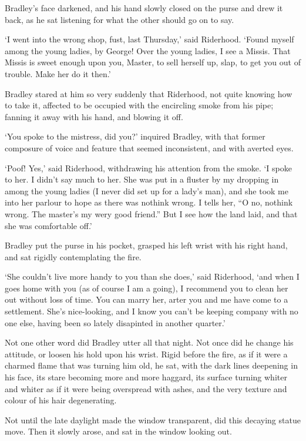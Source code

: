 Bradley’s face darkened, and his hand slowly closed on the purse and
drew it back, as he sat listening for what the other should go on to
say.

‘I went into the wrong shop, fust, last Thursday,’ said Riderhood.
‘Found myself among the young ladies, by George! Over the young ladies,
I see a Missis. That Missis is sweet enough upon you, Master, to sell
herself up, slap, to get you out of trouble. Make her do it then.’

Bradley stared at him so very suddenly that Riderhood, not quite knowing
how to take it, affected to be occupied with the encircling smoke from
his pipe; fanning it away with his hand, and blowing it off.

‘You spoke to the mistress, did you?’ inquired Bradley, with that
former composure of voice and feature that seemed inconsistent, and with
averted eyes.

‘Poof! Yes,’ said Riderhood, withdrawing his attention from the smoke.
‘I spoke to her. I didn’t say much to her. She was put in a fluster by
my dropping in among the young ladies (I never did set up for a lady’s
man), and she took me into her parlour to hope as there was nothink
wrong. I tells her, “O no, nothink wrong. The master’s my wery good
friend.” But I see how the land laid, and that she was comfortable off.’

Bradley put the purse in his pocket, grasped his left wrist with his
right hand, and sat rigidly contemplating the fire.

‘She couldn’t live more handy to you than she does,’ said Riderhood,
‘and when I goes home with you (as of course I am a going), I recommend
you to clean her out without loss of time. You can marry her, arter you
and me have come to a settlement. She’s nice-looking, and I know
you can’t be keeping company with no one else, having been so lately
disapinted in another quarter.’

Not one other word did Bradley utter all that night. Not once did he
change his attitude, or loosen his hold upon his wrist. Rigid before the
fire, as if it were a charmed flame that was turning him old, he sat,
with the dark lines deepening in his face, its stare becoming more and
more haggard, its surface turning whiter and whiter as if it were being
overspread with ashes, and the very texture and colour of his hair
degenerating.

Not until the late daylight made the window transparent, did this
decaying statue move. Then it slowly arose, and sat in the window
looking out.

